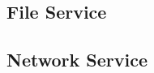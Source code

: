 
\subsection{File Service}
\label{sub:file_service}

\subsection{Network Service}
\label{sub:network_service}
